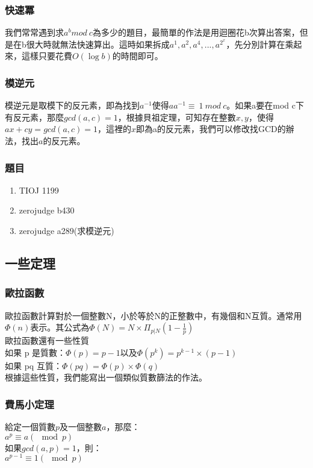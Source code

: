 \subsubsection{快速冪}
我們常常遇到求$a^b mod\ c$為多少的題目，最簡單的作法是用迴圈花b次算出答案，但是在b很大時就無法快速算出。這時如果拆成$a^1,a^2,a^4,...,a^{2^x}$，先分別計算在乘起來，這樣只要花費$O(\log b)$的時間即可。

\subsubsection{模逆元}
模逆元是取模下的反元素，即為找到$a^{-1}$使得$aa^{-1}\equiv\ 1\ mod\ c$。如果a要在mod c下有反元素，那麼$gcd(a,c)=1$，根據貝祖定理，可知存在整數$x,y$，使得$ax+cy=gcd(a,c)=1$，這裡的$x$即為a的反元素，我們可以修改找GCD的辦法，找出$a$的反元素。

\subsubsection{題目}
\begin{enumerate}
\item TIOJ 1199
\item zerojudge b430
\item zerojudge a289(求模逆元)
\end{enumerate}
\subsection{一些定理}
\subsubsection{歐拉函數}
歐拉函數計算對於一個整數N，小於等於N的正整數中，有幾個和N互質。通常用$\Phi(n)$表示。其公式為$\Phi(N)=N\times\Pi_{p|N}(1-\frac{1}{p})$\\

歐拉函數還有一些性質\\
如果 p 是質數：$\Phi(p) = p-1$以及$\Phi(p^k)=p^{k−1}\times (p−1)$\\
如果 pq 互質：$\Phi(pq) = \Phi(p)\times\Phi(q)$\\
根據這些性質，我們能寫出一個類似質數篩法的作法。

\subsubsection{費馬小定理}
給定一個質數$p$及一個整數$a$，那麼：\\
$a^p \equiv a (\mod p)$\\
如果$gcd(a,p)=1$，則：\\
$a^{p-1} \equiv 1 (\mod p)$\\

